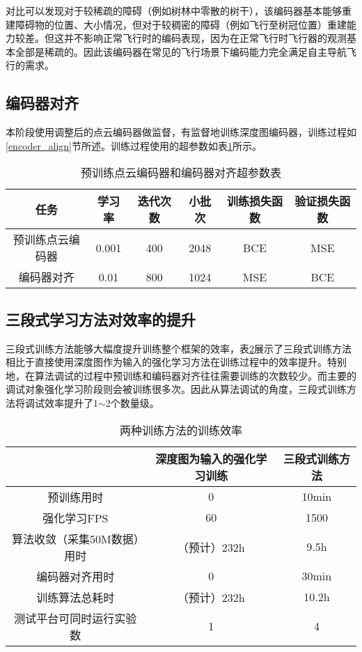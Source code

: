 对比可以发现对于较稀疏的障碍（例如树林中零散的树干），该编码器基本能够重建障碍物的位置、大小情况，但对于较稠密的障碍（例如飞行至树冠位置）重建能力较差。但这并不影响正常飞行时的编码表现，因为在正常飞行时飞行器的观测基本全部是稀疏的。因此该编码器在常见的飞行场景下编码能力完全满足自主导航飞行的需求。

\subsection{编码器对齐}

本阶段使用调整后的点云编码器做监督，有监督地训练深度图编码器，训练过程如\ref{encoder_align}节所述。训练过程使用的超参数如表\ref{encoder_param}所示。

\begin{table}
    \centering
    \begin{tabular}{cccccc}
    \hline
        任务 & 学习率 & 迭代次数 & 小批次 & 训练损失函数 & 验证损失函数 \\ \hline
        预训练点云编码器 & 0.001 & 400 & 2048 & BCE & MSE \\ 
        编码器对齐 & 0.01 & 800 & 1024 & MSE & BCE \\ \hline
    \end{tabular}
    \label{encoder_param}
    \caption{预训练点云编码器和编码器对齐超参数表}
\end{table}

\subsection{三段式学习方法对效率的提升}

三段式训练方法能够大幅度提升训练整个框架的效率，表\ref{simulation_eff}展示了三段式训练方法相比于直接使用深度图作为输入的强化学习方法在训练过程中的效率提升。特别地，在算法调试的过程中预训练和编码器对齐往往需要训练的次数较少。而主要的调试对象强化学习阶段则会被训练很多次。因此从算法调试的角度，三段式训练方法将调试效率提升了1$\sim$2个数量级。

\begin{table}
    \centering
    \begin{tabular}{ccc}
    \hline
        ~ &  深度图为输入的强化学习训练 & 三段式训练方法 \\ \hline
        预训练用时 & 0 & 10min \\ 
        强化学习FPS & 60 & 1500 \\ 
        算法收敛（采集50M数据）用时 & （预计）232h & 9.5h \\ 
        编码器对齐用时 & 0 & 30min \\ 
        训练算法总耗时 & （预计）232h & 10.2h \\ 
        测试平台可同时运行实验数 & 1 & 4 \\ \hline
    \end{tabular}
    \caption{两种训练方法的训练效率}
    \label{simulation_eff}
\end{table}

